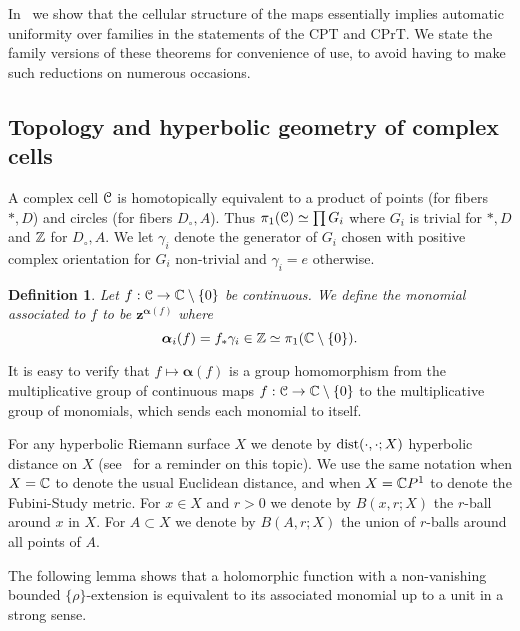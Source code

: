 \documentclass[reqno]{amsart}
\newtheorem{Def}[Cor]{Definition}{\bfseries}{\rmfamily}
\renewcommand\~[1]{\widetilde{#1}}
\def\vz{{\mathbf z}}
\def\valpha{{\boldsymbol\alpha}}
\def\he#1{{\{#1\}}}
\def\hrho{{\he\rho}}
\begin{document}
In~ we show that the cellular structure
of the maps essentially implies automatic uniformity over families in
the statements of the CPT and CPrT. We state the family versions of
these theorems for convenience of use, to avoid having to make such
reductions on numerous occasions.


\subsection{Topology and hyperbolic geometry of complex cells}

A complex cell ${\mathcal C}$ is homotopically equivalent to a product of
points (for fibers $*,D$) and circles (for fibers $D_\circ,A$). Thus
$\pi_1({\mathcal C})\simeq\prod G_i$ where $G_i$ is trivial for $*,D$ and ${\mathbb Z}$
for $D_\circ,A$. We let $\gamma_i$ denote the generator of $G_i$
chosen with positive complex orientation for $G_i$ non-trivial and
$\gamma_i=e$ otherwise. 

\begin{Def}
  Let $f:{\mathcal C}\to{\mathbb C}\setminus\{0\}$ be continuous. We define the
  monomial associated to $f$ to be $\vz^{\valpha(f)}$ where
  \begin{equation}
    \valpha_i(f) = f_*\gamma_i \in \Z\simeq \pi_1(\C\setminus\{0\}).
  \end{equation}
\end{Def}

It is easy to verify that $f\mapsto\valpha(f)$ is a group homomorphism
from the multiplicative group of continuous maps
$f:{\mathcal C}\to{\mathbb C}\setminus\{0\}$ to the multiplicative group of monomials,
which sends each monomial to itself.

For any hyperbolic Riemann surface $X$ we denote by
$\operatorname{dist}(\cdot,\cdot;X)$ hyperbolic distance on $X$
(see~ for a reminder on this topic). We use
the same notation when $X={\mathbb C}$ to denote the usual Euclidean distance,
and when $X={\mathbb C} P^1$ to denote the Fubini-Study metric. For $x\in X$
and $r>0$ we denote by $B(x,r;X)$ the $r$-ball around $x$ in $X$. For
$A\subset X$ we denote by $B(A,r;X)$ the union of $r$-balls around all
points of $A$.

The following lemma shows that a holomorphic function with a
non-vanishing bounded $\hrho$-extension is equivalent to its
associated monomial up to a unit in a strong sense.
\end{document}
